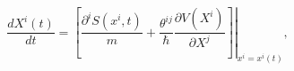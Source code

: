 \begin{equation}
\frac{dX^{i}(t)}{dt}=\left.  \left[  \frac{\partial^{i}S(x^{i},t)}{m}%
+\frac{\theta^{ij}}{\hbar}\frac{\partial V(X^{i})}{\partial X^{j}}\right]
\right|  _{x^{i}=x^{i}(t)},\label{23}%
\end{equation}

